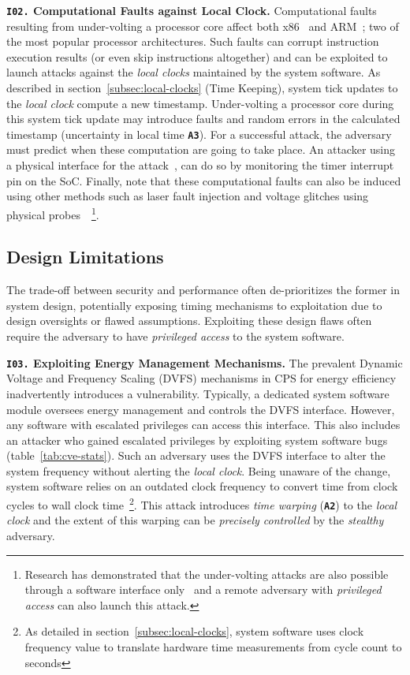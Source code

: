 \noindent\textbf{\texttt{I02.} Computational Faults against Local Clock.} Computational faults resulting from under-volting a processor core affect both x86~\cite{hardware-plundervolt, hardware-V0ltpawn, hardware-voltage-pillager} and ARM~\cite{clock-sync-fault-presence, hardware-volt-jockey}; two of the most popular processor architectures. Such faults can corrupt instruction execution results (or even skip instructions altogether) and can be exploited to launch attacks against the \textit{local clocks} maintained by the system software. As described in section~\ref{subsec:local-clocks} (Time Keeping), system tick updates to the \textit{local clock} compute a new timestamp. Under-volting a processor core during this system tick update may introduce faults and random errors in the calculated timestamp (uncertainty in local time \textbf{\texttt{A3}}). For a successful attack, the adversary must predict when these computation are going to take place. An attacker using a physical interface for the attack~\cite{hardware-voltage-pillager}, can do so by monitoring the timer interrupt pin on the SoC. Finally, note that these computational faults can also be induced using other methods such as laser fault injection and voltage glitches using physical probes~\cite{hardware-plundervolt, hardware-V0ltpawn}~\footnote{Research has demonstrated that the under-volting attacks are also possible through a software interface only~\cite{hardware-voltage-pillager} and a remote adversary with \textit{privileged access} can also launch this attack.}.

\subsection{Design Limitations}
The trade-off between security and performance often de-prioritizes the former in system design, potentially exposing timing mechanisms to exploitation due to design oversights or flawed assumptions. Exploiting these design flaws often require the adversary to have \textit{privileged access} to the system software.

\noindent\textbf{\texttt{I03.} Exploiting Energy Management Mechanisms.} The prevalent Dynamic Voltage and Frequency Scaling (DVFS) mechanisms in CPS for energy efficiency inadvertently introduces a vulnerability. Typically, a dedicated system software module oversees energy management and controls the DVFS interface. However, any software with escalated privileges can access this interface. This also includes an attacker who gained escalated privileges by exploiting system software bugs (table~\ref{tab:cve-stats}). Such an adversary uses the DVFS interface to alter the system frequency without alerting the \textit{local clock}. Being unaware of the change, system software relies on an outdated clock frequency to convert time from clock cycles to wall clock time~\footnote{As detailed in section~\ref{subsec:local-clocks}, system software uses clock frequency value to translate hardware time measurements from cycle count to seconds}. This attack introduces \textit{time warping} (\textbf{\texttt{A2}}) to the \textit{local clock} and the extent of this warping can be \textit{precisely controlled} by the \textit{stealthy} adversary.

